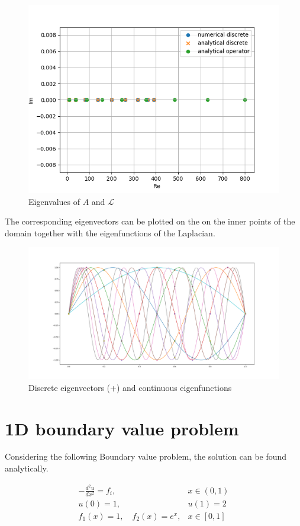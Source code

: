\documentclass{article}
\begin{document}
\begin{figure}[H]
    \centering
    \includegraphics[width=.9\linewidth]{eigenvals.png}
    \caption{Eigenvalues of $A$ and $\mathcal{L}$}
\end{figure}
The corresponding eigenvectors can be plotted on the on the inner points of the domain together with the eigenfunctions of the Laplacian.
\begin{figure}[H]
    \centering
    \includegraphics[width=.9\linewidth]{Eigenfuncs.png}
    \caption{Discrete eigenvectors (+) and continuous eigenfunctions}
\end{figure}

\section{1D boundary value problem}
Considering the following Boundary value problem, the solution can be found analytically.

\begin{align}
    -\frac{d^{2} u}{d x^{2}}=f_{i}, & x \in(0,1) \\ u(0)=1, & u(1)=2 \\ f_{1}(x)=1, \quad f_{2}(x)=e^{x}, & x \in[0,1]
\end{align}
\end{document}
